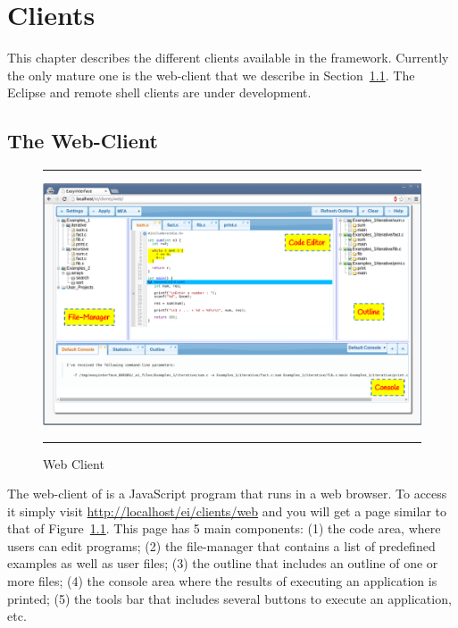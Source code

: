 {%
}

\chapter{\ei Clients}
\label{ch:clients}

This chapter describes the different clients available in the \ei
framework. Currently the only mature one is the web-client that we
describe in Section~\ref{ch:clients:web}. The Eclipse and remote shell
clients are under development.

\section{The Web-Client}
\label{ch:clients:web}

\begin{figure}[h]
\hrule\smallskip
\begin{center}
\includegraphics[width=1\textwidth]{fig/webclient.pdf}
\end{center}
\caption{\ei Web Client}
\label{fig:webclient}
\hrule
\end{figure}

The web-client of \ei is a JavaScript program that runs in a web
browser. To access it simply visit
\url{http://localhost/ei/clients/web} and you will get a page similar
to that of Figure~\ref{fig:webclient}.
%
This page has 5 main components: (1) the code area, where users can
edit programs; (2) the file-manager that contains a list of predefined
examples as well as user files; (3) the outline that includes an
outline of one or more files; (4) the console area where the results of
executing an application is printed; (5) the tools bar that includes
several buttons to execute an application, etc.

